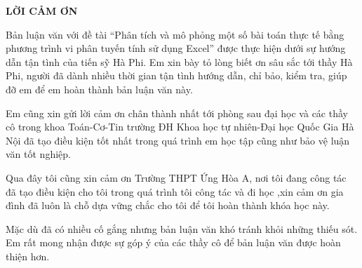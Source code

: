 \begin{center}
	\textbf{\fontsize{15pt}{0pt}\selectfont LỜI CẢM ƠN}
\end{center}

Bản luận văn với đề tài “Phân tích và mô phỏng một số bài toán thực tế bằng phương trình vi phân tuyến tính sử dụng Excel” được thực hiện dưới sự hướng dẫn tận tình của tiến sỹ Hà Phi. Em xin bày tỏ lòng biết ơn sâu sắc tới  thầy Hà Phi, người đã dành nhiều thời gian tận tình hướng dẫn, chỉ bảo, kiểm tra, giúp đỡ em để em hoàn thành bản luận văn này.

     Em cũng xin gửi lời cảm ơn chân thành nhất tới phòng sau đại học và các thầy cô trong  khoa Toán-Cơ-Tin trường ĐH Khoa học tự nhiên-Đại học Quốc Gia Hà Nội đã tạo điều kiện tốt nhất trong quá trình em học tập cũng như bảo vệ luận văn tốt nghiệp.
     
     Qua đây tôi cũng xin cảm ơn Trường THPT Ứng Hòa A, nơi tôi đang công tác đã tạo điều kiện cho tôi trong quá trình tôi công tác và đi học ,xin cảm ơn gia đình đã luôn là chỗ dựa vững chắc cho tôi để tôi hoàn thành khóa học này.
     
     Mặc dù đã có nhiều cố gắng nhưng bản luận văn khó tránh khỏi những thiếu sót. Em rất mong nhận được sự góp ý của các thầy cô để bản luận văn được hoàn thiện hơn.
     
